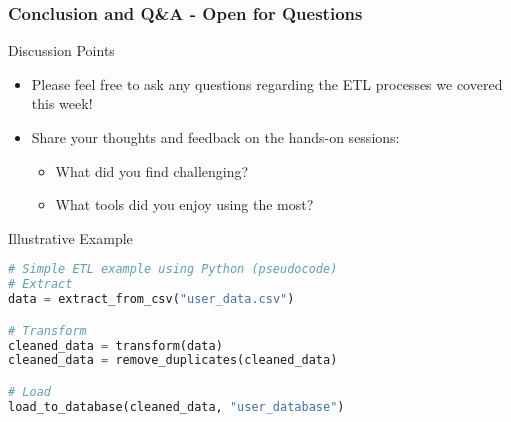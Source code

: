 \documentclass[aspectratio=169]{beamer}
\begin{document}
\begin{frame}[fragile]
  \frametitle{Conclusion and Q\&A - Open for Questions}
  
  \begin{block}{Discussion Points}
    \begin{itemize}
      \item Please feel free to ask any questions regarding the ETL processes we covered this week!
      \item Share your thoughts and feedback on the hands-on sessions: 
      \begin{itemize}
        \item What did you find challenging? 
        \item What tools did you enjoy using the most?
      \end{itemize}
    \end{itemize}
  \end{block}

  \begin{block}{Illustrative Example}
    \begin{lstlisting}[language=Python]
# Simple ETL example using Python (pseudocode)
# Extract
data = extract_from_csv("user_data.csv")

# Transform
cleaned_data = transform(data)
cleaned_data = remove_duplicates(cleaned_data)

# Load
load_to_database(cleaned_data, "user_database")
    \end{lstlisting}
  \end{block}
\end{frame}
\end{document}
